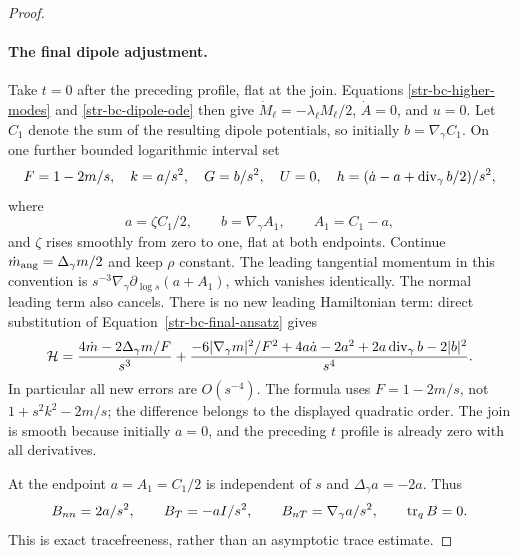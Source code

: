 \begin{proof}
\paragraph{The final dipole adjustment.}
Take $t=0$ after the preceding profile, flat at the join. Equations
\eqref{str-bc-higher-modes} and \eqref{str-bc-dipole-ode} then give
$\dot M_\ell=-\lambda_\ell M_\ell/2$, $\dot A=0$, and $u=0$.
Let $C_1$ denote the sum of the resulting dipole potentials, so initially
$b=\nabla_\gamma C_1$. On one further bounded logarithmic interval set
\begin{equation}
 F=1-2m/s,\quad k=a/s^2,\quad G=b/s^2,\quad U=0,\quad
 h=(\dot a-a+\operatorname{div}_\gamma b/2)/s^2,
 \label{str-bc-final-ansatz}
\end{equation}
where
\begin{equation}
 a=\zeta C_1/2,\qquad b=\nabla_\gamma A_1,
 \qquad A_1=C_1-a,
 \label{str-bc-final-interpolation}
\end{equation}
and $\zeta$ rises smoothly from zero to one, flat at both endpoints.
Continue $\dot m_{\rm ang}=\Delta_\gamma m/2$ and keep $\rho$ constant.
The leading tangential momentum in this convention is
$s^{-3}\nabla_\gamma\partial_{\log s}(a+A_1)$, which vanishes identically.
The normal leading term also cancels. There is no new leading Hamiltonian
term: direct substitution of Equation~\eqref{str-bc-final-ansatz} gives
\begin{equation}
 \mathcal H=\frac{4\dot m-2\Delta_\gamma m/F}{s^3}
 +\frac{-6|\nabla_\gamma m|^2/F^2+4a\dot a-2a^2
       +2a\operatorname{div}_\gamma b-2|b|^2}{s^4}.
 \label{str-bc-final-H}
\end{equation}
In particular all new errors are $O(s^{-4})$. The formula uses
$F=1-2m/s$, not $1+s^2k^2-2m/s$; the difference belongs to the displayed
quadratic order. The join is smooth because initially $a=0$, and the
preceding $t$ profile is already zero with all derivatives.

At the endpoint $a=A_1=C_1/2$ is independent of $s$ and
$\Delta_\gamma a=-2a$. Thus
\begin{equation}
 B_{nn}=2a/s^2,\qquad B_T=-aI/s^2,\qquad
 B_{nT}=\nabla_\gamma a/s^2,\qquad \operatorname{tr}_qB=0.
 \label{str-bc-tracefree-tail}
\end{equation}
This is exact tracefreeness, rather than an asymptotic trace estimate.


\end{proof}
